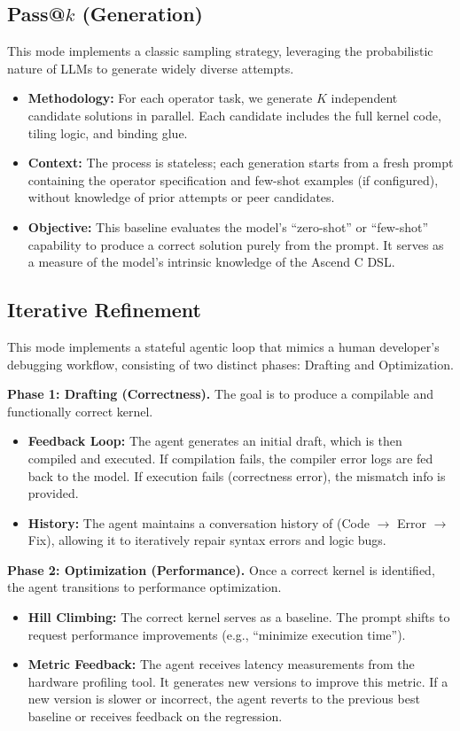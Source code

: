 \documentclass{article} %
\theoremstyle{definition}
\theoremstyle{remark}
\begin{document}
  \subsection{\texorpdfstring{Pass@$k$ (Generation)}{Pass-k (Generation)}}
  This mode implements a classic sampling strategy, leveraging the probabilistic nature of LLMs to generate widely diverse attempts.
  \begin{itemize}
      \item \textbf{Methodology:} For each operator task, we generate $K$ independent candidate solutions in parallel. Each candidate includes the full kernel code, tiling logic, and binding glue.
      \item \textbf{Context:} The process is stateless; each generation starts from a fresh prompt containing the operator specification and few-shot examples (if configured), without knowledge of prior attempts or peer candidates.
      \item \textbf{Objective:} This baseline evaluates the model's ``zero-shot'' or ``few-shot'' capability to produce a correct solution purely from the prompt. It serves as a measure of the model's intrinsic knowledge of the Ascend C DSL.
  \end{itemize}

  \subsection{Iterative Refinement}
  This mode implements a stateful agentic loop that mimics a human developer's debugging workflow, consisting of two distinct phases: Drafting and Optimization.

  \textbf{Phase 1: Drafting (Correctness).}
  The goal is to produce a compilable and functionally correct kernel.
  \begin{itemize}
      \item \textbf{Feedback Loop:} The agent generates an initial draft, which is then compiled and executed. If compilation fails, the compiler error logs are fed back to the model. If execution fails (correctness error), the mismatch info is provided.
      \item \textbf{History:} The agent maintains a conversation history of (Code $\to$ Error $\to$ Fix), allowing it to iteratively repair syntax errors and logic bugs.
  \end{itemize}

  \textbf{Phase 2: Optimization (Performance).}
  Once a correct kernel is identified, the agent transitions to performance optimization.
  \begin{itemize}
      \item \textbf{Hill Climbing:} The correct kernel serves as a baseline. The prompt shifts to request performance improvements (e.g., ``minimize execution time'').
      \item \textbf{Metric Feedback:} The agent receives latency measurements from the hardware profiling tool. It generates new versions to improve this metric. If a new version is slower or incorrect, the agent reverts to the previous best baseline or receives feedback on the regression.
  \end{itemize}
\end{document}
